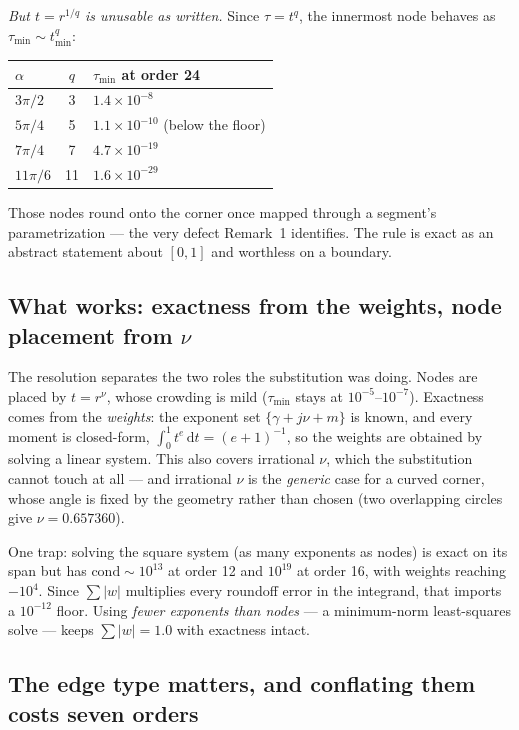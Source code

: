 \documentclass[11pt]{article}
\theoremstyle{remark}
\newcommand{\dd}{\,\mathrm{d}}
\begin{document}
\emph{But $t=r^{1/q}$ is unusable as written.} Since $\tau=t^{q}$, the innermost
node behaves as $\tau_{\min}\sim t_{\min}^{q}$:

\begin{center}
\begin{tabular}{lcl}
\toprule
$\alpha$ & $q$ & $\tau_{\min}$ at order 24\\
\midrule
$3\pi/2$  & 3  & $1.4\times10^{-8}$\\
$5\pi/4$  & 5  & $1.1\times10^{-10}$ \quad(below the floor)\\
$7\pi/4$  & 7  & $4.7\times10^{-19}$\\
$11\pi/6$ & 11 & $1.6\times10^{-29}$\\
\bottomrule
\end{tabular}
\end{center}

\noindent
Those nodes round onto the corner once mapped through a segment's
parametrization --- the very defect Remark~1 identifies. The rule is exact as an
abstract statement about $[0,1]$ and worthless on a boundary.

\subsection{What works: exactness from the weights, node placement from $\nu$}

The resolution separates the two roles the substitution was doing. Nodes are
placed by $t=r^{\nu}$, whose crowding is mild ($\tau_{\min}$ stays at
$10^{-5}$--$10^{-7}$). Exactness comes from the \emph{weights}: the exponent set
$\{\gamma+j\nu+m\}$ is known, and every moment is closed-form,
$\int_0^1 t^{e}\dd t=(e+1)^{-1}$, so the weights are obtained by solving a linear
system. This also covers irrational $\nu$, which the substitution cannot touch at
all --- and irrational $\nu$ is the \emph{generic} case for a curved corner, whose
angle is fixed by the geometry rather than chosen (two overlapping circles give
$\nu=0.657360$).

One trap: solving the square system (as many exponents as nodes) is exact on its
span but has $\mathrm{cond}\sim10^{13}$ at order 12 and $10^{19}$ at order 16,
with weights reaching $-10^{4}$. Since $\sum|w|$ multiplies every roundoff error
in the integrand, that imports a $10^{-12}$ floor. Using \emph{fewer exponents
than nodes} --- a minimum-norm least-squares solve --- keeps $\sum|w|=1.0$ with
exactness intact.

\subsection{The edge type matters, and conflating them costs seven orders}
\end{document}
